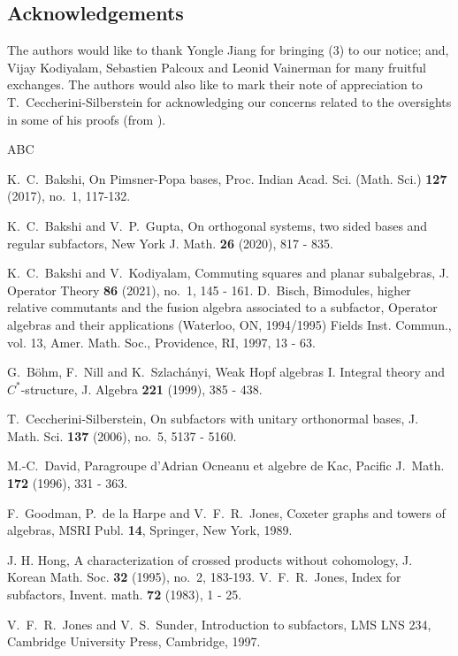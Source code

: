 \documentclass{amsart}
\theoremstyle{definition}
\theoremstyle{theorem}
\begin{document}
\color{black}


\subsection*{Acknowledgements}
The authors would like to thank Yongle Jiang for bringing
(3) to our notice; and, Vijay Kodiyalam, Sebastien
Palcoux and Leonid Vainerman for many fruitful exchanges. The authors
would also like to mark their note of appreciation to
T.~Ceccherini-Silberstein for acknowledging our concerns related to
the oversights in some of his proofs (from \cite{S}).
\begin{thebibliography}{ABC}

 K.~C.~Bakshi, On Pimsner-Popa bases, Proc. Indian
  Acad. Sci. (Math. Sci.) {\bf 127} (2017), no.~1, 117-132.

 K.~C.~Bakshi and V.~P.~Gupta, On orthogonal systems, two
  sided bases and regular subfactors, New York J. Math. {\bf 26}
  (2020), 817 - 835.

 K.~C.~Bakshi and V.~Kodiyalam, Commuting squares and
  planar subalgebras, J. Operator Theory {\bf 86} (2021), no.~1, 145 - 161.
\color{black}
   D.~Bisch, Bimodules, higher relative commutants and the
  fusion algebra associated to a subfactor, Operator algebras and
  their applications (Waterloo, ON, 1994/1995) Fields Inst. Commun.,
  vol. 13, Amer. Math. Soc., Providence, RI, 1997, 13 - 63.


 G.~B\"ohm, F.~Nill and K.~Szlach\'anyi, Weak Hopf
  algebras I. Integral theory and $C^*$-structure, J.  Algebra {\bf
    221} (1999), 385 - 438.

 T.~Ceccherini-Silberstein, On subfactors with unitary
  orthonormal bases, J. Math. Sci. {\bf 137} (2006), no.~5, 5137 -
  5160.

 M.-C.~David, Paragroupe d’Adrian Ocneanu et algebre de
  Kac, Pacific J.~Math.  {\bf 172} (1996), 331 - 363.

 F.~Goodman, P.~de la Harpe and V.~F.~R.~Jones, Coxeter
  graphs and towers of algebras, MSRI Publ. {\bf 14}, Springer, New
  York, 1989.

 J. H. Hong,  A characterization of crossed products without cohomology, J. Korean Math. Soc.  {\bf 32} (1995), no.~2, 183-193.\color{black}
 V.~F.~R.~Jones, Index for subfactors, Invent. math.  {\bf
  72} (1983), 1 - 25.

 V.~F.~R.~Jones and V.~S.~Sunder, Introduction to
  subfactors, LMS LNS 234, Cambridge University Press, Cambridge,
  1997.



\end{thebibliography}
\end{document}
